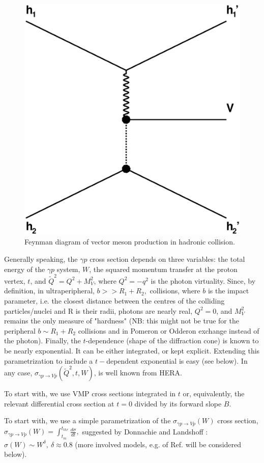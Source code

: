 \documentclass[12pt]{article}
\begin{document}
\begin{figure}[!h]
\centering
 \includegraphics[width=.4\textwidth]{figures/exclusive_vmp.eps}
 \caption{Feynman diagram of vector meson production in hadronic collision.}
 \label{fig:vmp_feynman}
\end{figure}

Generally speaking, the $\gamma p$ cross section depends on three variables: the total energy of the $\gamma p$ system, $W$,
the squared momentum transfer at the proton vertex, $t$, and $\tilde Q^2=Q^2+M_V^2$, where $Q^2=-q^2$ is the photon virtuality. Since, by definition, in ultraperipheral, $b>>R_1+R_2,$
collisions, where $b$ is the impact parameter, i.e. the closest distance between the centres of the colliding particles/nuclei and R is their radii,
photons are nearly real, $Q^2=0$, and $M_V^2$ remains the only measure of "hardness" (NB: this might not be true for the peripheral $b\sim R_1+R_2$ collisions and in
Pomeron or Odderon exchange instead of the photon). Finally, the $t$-dependence (shape of the diffraction cone) is known to be nearly exponential. It can be either integrated, or
kept explicit. Extending this parametrization to include a $t-$dependent exponential is easy (see below).
In any case, $\sigma_{\gamma p\rightarrow Vp}(\tilde Q^2, t, W)$, is well known from HERA.

To start with, we use VMP cross sections integrated in $t$ or, equivalently, the relevant differential cross section
at $t=0$ divided by its forward slope $B$.


To start with, we use a simple parametrization of the $\sigma_{\gamma p\rightarrow Vp}(W)$ cross section, $\sigma_{\gamma p\rightarrow Vp}(W)=\int_{t_m}^{t_{thr}}\frac{d\sigma}{dt},$
suggested by Donnachie and Landshoff \cite{DL}: $\sigma(W)\sim W^{\delta},\ \delta\approx 0.8$ (more involved models, e.g. of Ref. \cite{Capua, Fazio} will be considered below).
\end{document}
